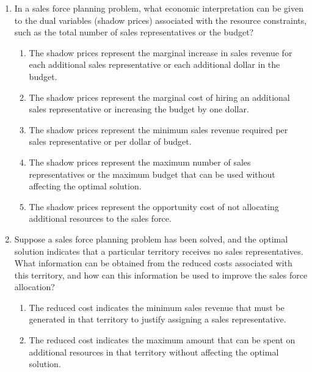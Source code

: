 \documentclass{article}%
\begin{document}
\begin{enumerate}
\begin{enumerate}
\item Constraints are formulated as inequalities representing the total number of sales representatives available and the total budget allocated for salaries.%
\item Constraints are formulated as equalities representing the exact sales revenue required from each territory.%
\item Constraints are formulated as a combination of inequalities and equalities, reflecting both resource limitations and sales targets.%
\end{enumerate}%
\vspace{1em}%
\item In a sales force planning problem, what economic interpretation can be given to the dual variables (shadow prices) associated with the resource constraints, such as the total number of sales representatives or the budget?%
\begin{enumerate}%
\item The shadow prices represent the marginal increase in sales revenue for each additional sales representative or each additional dollar in the budget.%
\item The shadow prices represent the marginal cost of hiring an additional sales representative or increasing the budget by one dollar.%
\item The shadow prices represent the minimum sales revenue required per sales representative or per dollar of budget.%
\item The shadow prices represent the maximum number of sales representatives or the maximum budget that can be used without affecting the optimal solution.%
\item The shadow prices represent the opportunity cost of not allocating additional resources to the sales force.%
\end{enumerate}%
\vspace{1em}%
\item Suppose a sales force planning problem has been solved, and the optimal solution indicates that a particular territory receives no sales representatives. What information can be obtained from the reduced costs associated with this territory, and how can this information be used to improve the sales force allocation?%
\begin{enumerate}%
\item The reduced cost indicates the minimum sales revenue that must be generated in that territory to justify assigning a sales representative.%
\item The reduced cost indicates the maximum amount that can be spent on additional resources in that territory without affecting the optimal solution.%

\end{enumerate}
\end{enumerate}
\end{document}
